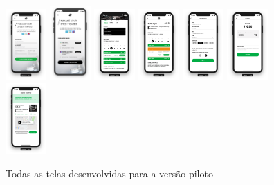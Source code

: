 \begin{figure}[H]
    \includegraphics[width=0.14\textwidth]{pfc/figuras/add-card.png}
    \includegraphics[width=0.14\textwidth]{pfc/figuras/manage-cards.png}
    \includegraphics[width=0.14\textwidth]{pfc/figuras/tr-gym-profile-2.png}
    \includegraphics[width=0.14\textwidth]{pfc/figuras/tr-availability-2.png}
    \includegraphics[width=0.14\textwidth]{pfc/figuras/tr-new-booking.png}
    \includegraphics[width=0.14\textwidth]{pfc/figuras/tr-booking-payment.png}
    \includegraphics[width=0.14\textwidth]{pfc/figuras/tr-booking-confirmed.png}
    \caption{Todas as telas desenvolvidas para a versão piloto}
    \label{fig:all-screens}
\end{figure}


